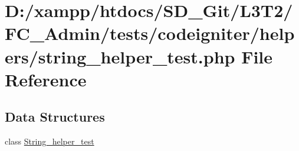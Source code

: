 \hypertarget{_admin_2tests_2codeigniter_2helpers_2string__helper__test_8php}{}\section{D\+:/xampp/htdocs/\+S\+D\+\_\+\+Git/\+L3\+T2/\+F\+C\+\_\+\+Admin/tests/codeigniter/helpers/string\+\_\+helper\+\_\+test.php File Reference}
\label{_admin_2tests_2codeigniter_2helpers_2string__helper__test_8php}
\subsection*{Data Structures}
\begin{DoxyCompactItemize}
\item 
class \hyperlink{class_string__helper__test}{String\+\_\+helper\+\_\+test}
\end{DoxyCompactItemize}
